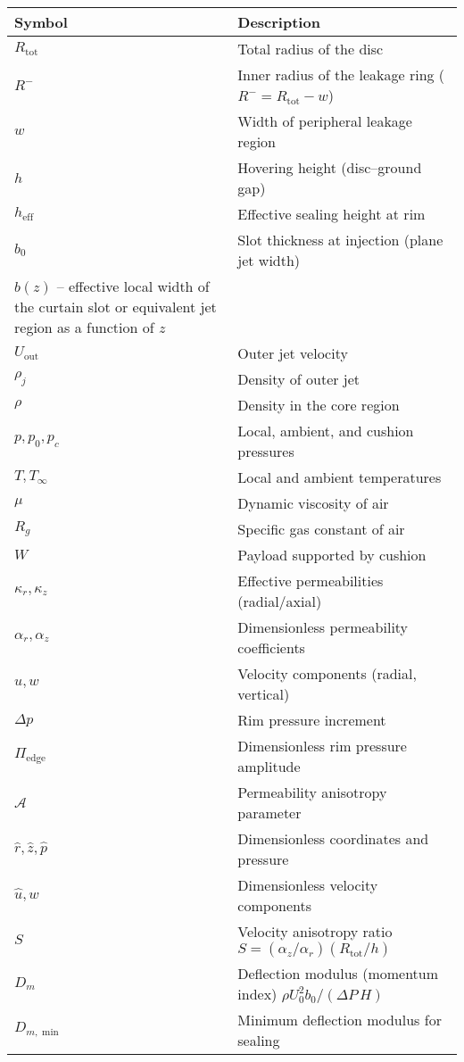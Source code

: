 \documentclass[11pt,a4paper]{article}
\begin{document}
\begin{tabular}{@{}ll@{}}
\toprule
Symbol & Description \\ \midrule
$R_{\mathrm{tot}}$ & Total radius of the disc \\
$R^{-}$ & Inner radius of the leakage ring ($R^{-}=R_{\mathrm{tot}}-w$) \\
$w$ & Width of peripheral leakage region \\
$h$ & Hovering height (disc--ground gap) \\
$h_{\mathrm{eff}}$ & Effective sealing height at rim \\
$b_0$ & Slot thickness at injection (plane jet width) \\
$b(z)$ -- effective local width of the curtain slot or equivalent jet region as a function of $z$ \\
$U_{\mathrm{out}}$ & Outer jet velocity \\
$\rho_j$ & Density of outer jet \\
$\rho$ & Density in the core region \\
$p,p_0,p_c$ & Local, ambient, and cushion pressures \\
$T,T_\infty$ & Local and ambient temperatures \\
$\mu$ & Dynamic viscosity of air \\
$R_g$ & Specific gas constant of air \\
$W$ & Payload supported by cushion \\
$\kappa_r,\kappa_z$ & Effective permeabilities (radial/axial) \\
$\alpha_r,\alpha_z$ & Dimensionless permeability coefficients \\
$u,w$ & Velocity components (radial, vertical) \\
$\Delta p$ & Rim pressure increment \\
$\Pi_{\mathrm{edge}}$ & Dimensionless rim pressure amplitude \\
$\mathcal{A}$ & Permeability anisotropy parameter \\
$\hat r,\hat z,\hat p$ & Dimensionless coordinates and pressure \\
$\hat u,\hat w$ & Dimensionless velocity components \\
$S$ & Velocity anisotropy ratio $S=(\alpha_z/\alpha_r)(R_{\mathrm{tot}}/h)$ \\ $D_m$ & Deflection modulus (momentum index) $\rho U_0^2 b_0/(\Delta P\,H)$ \\
$D_{m,\min}$ & Minimum deflection modulus for sealing \\

\end{tabular}
\end{document}
